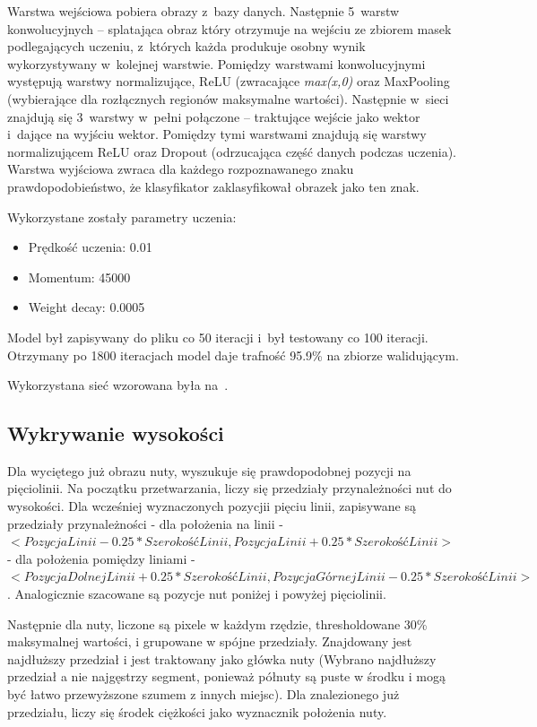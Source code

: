 \documentclass[a4paper,11pt]{article}
\begin{document}
Warstwa wejściowa pobiera obrazy z~bazy danych. Następnie 5~warstw konwolucyjnych -- splatająca obraz który otrzymuje na wejściu ze zbiorem masek podlegających uczeniu, z~których każda produkuje osobny wynik wykorzystywany w~kolejnej warstwie. Pomiędzy warstwami konwolucyjnymi występują warstwy normalizujące, ReLU (zwracające \emph{max(x,0)} oraz MaxPooling (wybierające dla rozłącznych regionów maksymalne wartości). Następnie w~sieci znajdują się 3~warstwy w~pełni połączone -- traktujące wejście jako wektor i~dające na wyjściu wektor. Pomiędzy tymi warstwami znajdują się warstwy normalizującem ReLU oraz Dropout (odrzucająca część danych podczas uczenia). Warstwa wyjściowa zwraca dla każdego rozpoznawanego znaku prawdopodobieństwo, że klasyfikator zaklasyfikował obrazek jako ten znak.

Wykorzystane zostały parametry uczenia:
\begin{itemize}
\item Prędkość uczenia: 0.01
\item Momentum: 45000
\item Weight decay: 0.0005
\end{itemize}

Model był zapisywany do pliku co 50 iteracji i~był testowany co 100 iteracji. Otrzymany po 1800 iteracjach model daje trafność 95.9\% na zbiorze walidującym.

Wykorzystana sieć wzorowana była na~\cite{NIPS2012_4824}.

\subsection{Wykrywanie wysokości}
Dla wyciętego już obrazu nuty, wyszukuje się prawdopodobnej pozycji na pięciolinii.
Na początku przetwarzania, liczy się przedziały przynależności nut do wysokości.
Dla wcześniej wyznaczonych pozycjii pięciu linii, zapisywane są przedziały przynależności - dla położenia na linii -
$<PozycjaLinii - 0.25 * SzerokośćLinii, PozycjaLinii + 0.25 * SzerokośćLinii>$ - dla położenia pomiędzy liniami -
$<PozycjaDolnejLinii + 0.25 * SzerokośćLinii, PozycjaGórnejLinii - 0.25 * SzerokośćLinii>$.
Analogicznie szacowane są pozycje nut poniżej i powyżej pięciolinii.

Następnie dla nuty, liczone są pixele w każdym rzędzie, thresholdowane 30\% maksymalnej wartości, i grupowane w spójne przedziały.
Znajdowany jest najdłuższy przedział i jest traktowany jako główka nuty
(Wybrano najdłuższy przedział a nie najgęstrzy segment, ponieważ półnuty są puste w środku i mogą być łatwo przewyższone szumem z innych miejsc).
Dla znalezionego już przedziału, liczy się środek ciężkości jako wyznacznik położenia nuty.
\end{document}

